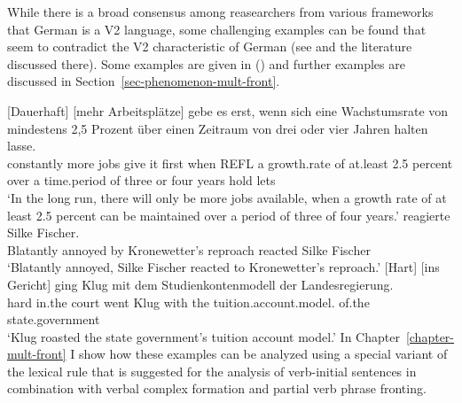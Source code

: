 While there is a broad consensus among reasearchers from various frameworks that German is a V2
language, some challenging examples can be found that seem to contradict the V2 characteristic
of German (see  and the literature discussed there). Some examples are given in
() and further examples are discussed in Section~\ref{sec-phenomenon-mult-front}.

\eal
\label{bsp-smvfb}
\ex 
\gll {}[Dauerhaft] [mehr Arbeitsplätze] gebe es erst, wenn sich eine Wachstumsrate von  mindestens 2,5 Prozent über einen Zeitraum von drei oder vier Jahren halten lasse.\footnotemark\\ 
       \spacebr{}constantly \spacebr{}more jobs give it first when REFL a growth.rate of  at.least 2.5 percent over a time.period of three or four years hold lets\\
\glt `In the long run, there will only be more jobs available, when a growth rate of at least 2.5 percent 
can be maintained over a period of three of four years.'	      
\ex 
{} reagierte Silke Fischer.\footnotemark\\
     \spacebr{}Blatantly annoyed \spacebr{}by Kronewetter's reproach reacted Silke Fischer\\
\glt `Blatantly annoyed, Silke Fischer reacted to Kronewetter's reproach.'
\ex 
\gll {}[Hart] [ins Gericht] ging Klug mit dem Studienkontenmodell der Landesregierung.\footnotemark\\
       \spacebr{}hard \spacebr{}in.the court went Klug with the tuition.account.model. of.the
       state.government\\
\glt `Klug roasted the state government's tuition account model.'
\zl
In Chapter~\ref{chapter-mult-front} I show how these examples can be analyzed using a special variant
of the lexical rule that is suggested for the analysis of verb-initial sentences in combination with verbal
complex formation and partial verb phrase fronting.




